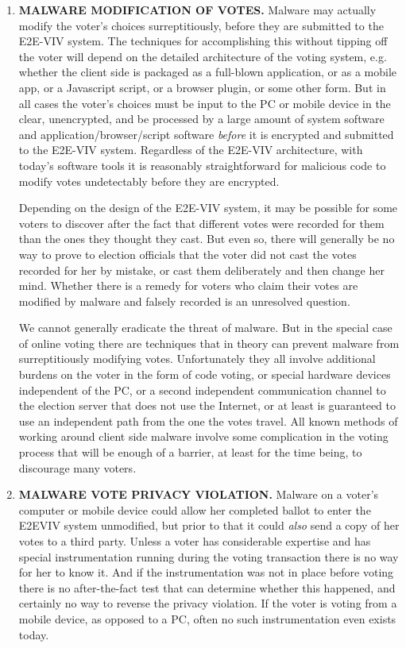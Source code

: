 \begin{enumerate}[label={\roman*})]
\item \textbf{MALWARE MODIFICATION OF VOTES.} Malware may actually
  modify the voter’s choices surreptitiously, before they are
  submitted to the E2E-VIV system. The techniques for accomplishing
  this without tipping off the voter will depend on the detailed
  architecture of the voting system, e.g. whether the client side is
  packaged as a full-blown application, or as a mobile app, or a
  Javascript script, or a browser plugin, or some other form. But in
  all cases the voter’s choices must be input to the PC or mobile
  device in the clear, unencrypted, and be processed by a large amount
  of system software and application/browser/script software
  \emph{before} it is encrypted and submitted to the E2E-VIV
  system. Regardless of the E2E-VIV architecture, with today’s
  software tools it is reasonably straightforward for malicious code
  to modify votes undetectably before they are encrypted.

  Depending on the design of the E2E-VIV system, it may be possible
  for some voters to discover after the fact that different votes were
  recorded for them than the ones they thought they cast. But even so,
  there will generally be no way to prove to election officials that
  the voter did not cast the votes recorded for her by mistake, or
  cast them deliberately and then change her mind. Whether there is a
  remedy for voters who claim their votes are modified by malware and
  falsely recorded is an unresolved question.

  We cannot generally eradicate the threat of malware. But in the
  special case of online voting there are techniques that in theory
  can prevent malware from surreptitiously modifying
  votes. Unfortunately they all involve additional burdens on the
  voter in the form of code voting, or special hardware devices
  independent of the PC, or a second independent communication channel
  to the election server that does not use the Internet, or at least
  is guaranteed to use an independent path from the one the votes
  travel. All known methods of working around client side malware
  involve some complication in the voting process that will be enough
  of a barrier, at least for the time being, to discourage many
  voters.

\item \textbf{MALWARE VOTE PRIVACY VIOLATION.} Malware on a voter’s
  computer or mobile device could allow her completed ballot to enter
  the E2EVIV system unmodified, but prior to that it could \emph{also}
  send a copy of her votes to a third party. Unless a voter has
  considerable expertise and has special instrumentation running
  during the voting transaction there is no way for her to know
  it. And if the instrumentation was not in place before voting there
  is no after-the-fact test that can determine whether this happened,
  and certainly no way to reverse the privacy violation. If the voter
  is voting from a mobile device, as opposed to a PC, often no such
  instrumentation even exists today.


\end{enumerate}

